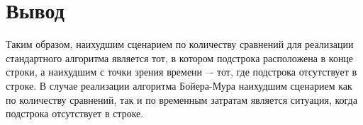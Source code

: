 \section{Вывод}
Таким образом, наихудшим сценарием по количеству сравнений для реализации
стандартного алгоритма является тот, в котором подстрока расположена 
в конце строки, а наихудшим с точки зрения времени –- тот, где 
подстрока отсутствует в строке. В случае реализации алгоритма Бойера-Мура 
наихудшим сценарием как по количеству сравнений, так и по 
временным затратам является ситуация, когда подстрока отсутствует
в строке.

